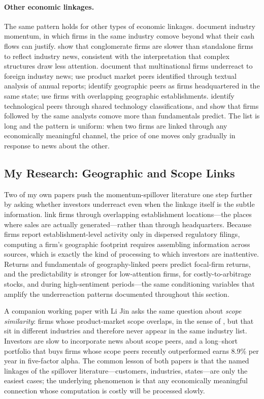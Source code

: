 \paragraph{Other economic linkages.} The same pattern holds for other types of economic linkages. \citet{moskowitz1999} document industry momentum, in which firms in the same industry comove beyond what their cash flows can justify. \citet{cohenlou2012} show that conglomerate firms are slower than standalone firms to reflect industry news, consistent with the interpretation that complex structures draw less attention. \citet{huang2015} document that multinational firms underreact to foreign industry news; \citet{hoberg2016} use product market peers identified through textual analysis of annual reports; \citet{parsons2020} identify geographic peers as firms headquartered in the same state; \citet{jinli2024} use firms with overlapping geographic establishments. \citet{lee2019} identify technological peers through shared technology classifications, and \citet{alihirshleifer2020} show that firms followed by the same analysts comove more than fundamentals predict. The list is long and the pattern is uniform: when two firms are linked through any economically meaningful channel, the price of one moves only gradually in response to news about the other.

\subsection{My Research: Geographic and Scope Links}

Two of my own papers push the momentum-spillover literature one step further by asking whether investors underreact even when the linkage itself is the subtle information. \citet{jinli2024} link firms through overlapping establishment locations---the places where sales are actually generated---rather than through headquarters. Because firms report establishment-level activity only in dispersed regulatory filings, computing a firm's geographic footprint requires assembling information across sources, which is exactly the kind of processing to which investors are inattentive. Returns and fundamentals of geography-linked peers predict focal-firm returns, and the predictability is stronger for low-attention firms, for costly-to-arbitrage stocks, and during high-sentiment periods---the same conditioning variables that amplify the underreaction patterns documented throughout this section.

A companion working paper with Li Jin asks the same question about \emph{scope similarity}: firms whose product-market scope overlaps, in the sense of \citet{hoberg2016}, but that sit in different industries and therefore never appear in the same industry list. Investors are slow to incorporate news about scope peers, and a long--short portfolio that buys firms whose scope peers recently outperformed earns 8.9\% per year in five-factor alpha. The common lesson of both papers is that the named linkages of the spillover literature---customers, industries, states---are only the easiest cases; the underlying phenomenon is that any economically meaningful connection whose computation is costly will be processed slowly.

